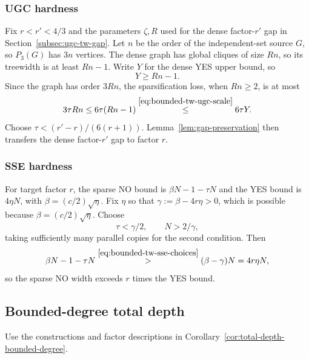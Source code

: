 \subsubsection{UGC hardness}
\label{app:transfer-tw-ugc}
Fix $r<r'<4/3$ and the parameters $\zeta,R$ used for the dense
factor-$r'$ gap in Section~\ref{subsec:ugc-tw-gap}.
Let $n$ be the order of the independent-set source $G$, so $P_3(G)$
has $3n$ vertices.
The dense graph has global cliques of size $Rn$, so its treewidth is
at least $Rn-1$. Write $Y$ for the dense YES upper bound, so
\begin{equation}\label{eq:bounded-tw-ugc-scale}
 Y\ge Rn-1.
\end{equation}
Since the graph has order $3Rn$, the sparsification
loss, when $Rn\ge2$, is at most
\[
 3\tau Rn\le6\tau(Rn-1)
 \overset{\eqref{eq:bounded-tw-ugc-scale}}{\le}6\tau Y.
\]
Choose
$\tau<(r'-r)/(6(r+1))$. Lemma~\ref{lem:gap-preservation} then
transfers the dense factor-$r'$ gap to factor $r$.

\subsubsection{SSE hardness}
\label{app:transfer-tw-sse}
For target factor $r$, the sparse NO bound is $\beta N-1-\tau N$
and the YES bound is $4\eta N$, with $\beta=(c/2)\sqrt\eta$.
Fix $\eta$ so that $\gamma:=\beta-4r\eta>0$, which is possible
because $\beta=(c/2)\sqrt\eta$. Choose
\begin{equation}\label{eq:bounded-tw-sse-choices}
 \tau<\gamma/2,\qquad N>2/\gamma,
\end{equation}
taking sufficiently many parallel copies for the second condition. Then
\[
 \beta N-1-\tau N
 \overset{\eqref{eq:bounded-tw-sse-choices}}{>}
 (\beta-\gamma)N=4r\eta N,
\]
so the sparse NO width exceeds $r$ times the YES bound.

\subsection{Bounded-degree total depth}
\label{app:transfer-total-depth}
Use the constructions and factor descriptions in
Corollary~\ref{cor:total-depth-bounded-degree}.

